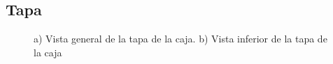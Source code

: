 \subsection{Tapa}

\begin{figure}[htpb]%
    \centering 
    \hspace{10pt}%
    \caption{a) Vista general de la tapa de la caja. b) Vista inferior de la tapa de la caja}
    \label{fig:cajatapa} 
\end{figure} 
